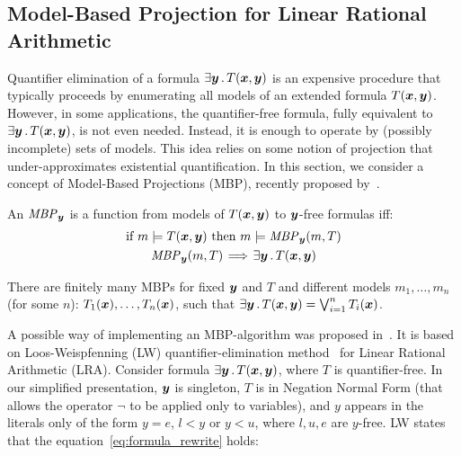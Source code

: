 \subsection{Model-Based Projection for Linear Rational Arithmetic}
\label{sec:mbp}

Quantifier elimination of a formula $\exists \vy \such T(\vx,\vy)$ is an expensive procedure that typically proceeds by enumerating all models of an extended formula $T(\vx,\vy)$.
However, in some applications, the quantifier-free formula, fully equivalent to $\exists \vy \such T(\vx,\vy)$, is not even needed.
Instead, it is enough to operate by (possibly incomplete) sets of models.
This idea relies on some notion of projection that under-approximates existential quantification.
In this section, we consider a concept of Model-Based Projections (MBP), recently proposed by~\cite{komuravelli2014smt,Dutertre}.

\begin{definition}
\label{def:mbp}
An $\mathit{MBP}_{\vy}$ is a function from models of
$T(\vx,\vy)$ to $\vy$-free formulas
iff:
\begin{gather}
\text{if }m\models T(\vx,\vy) \text{ then } m\models \mathit{MBP}_{\vy}(m,T) \label{mbp.cond1}\\
\mathit{MBP}_{\vy}(m,T) \!\implies\! \exists \vy \such T(\vx,\vy) \label{mbp.cond2}
\end{gather}
\end{definition}

There are finitely many MBPs for fixed  $\vy$ and $T$ and different models $m_1,\ldots,m_n$ (for some $n$):
$T_{1}(\vx),  \ldots, T_{n}(\vx)$, such that
$\exists \vy \such T(\vx,\vy) = \Lor_{i=1}^{n} T_{i}(\vx)$. 

A possible way of implementing an MBP-algorithm was proposed in~\cite{komuravelli2014smt}.
It is based on Loos-Weispfenning (LW)  quantifier-elimination method~\cite{loos1993applying} for Linear Rational Arithmetic (LRA).
Consider formula $\exists \vy \such T(\vx,\vy)$, where $T$ is quantifier-free.
In our simplified presentation,
$\vy$ is singleton, $T$ is in Negation Normal Form (that allows the operator $\neg$ to be applied only to variables), and $y$ appears in the literals only of the form ${y=e}$, ${l<y}$ or ${y<u}$, where $l,u,e$ are $y$-free.
LW states that the equation~\eqref{eq:formula_rewrite} holds:

